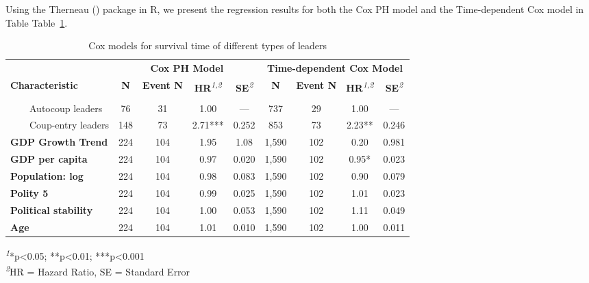 \documentclass[
  12pt,
]{report}
\begin{document}
Using the Therneau () package in R, we
present the regression results for both the Cox PH model and the
Time-dependent Cox model in Table Table~\ref{tbl-cox}.

\begingroup
\fontsize{12.0pt}{14.4pt}\selectfont
\setlength{\LTpost}{0mm}

\begin{longtable}{lcccccccc}

\caption{\label{tbl-cox}Cox models for survival time of different types
of leaders}

\tabularnewline

\toprule
 & \multicolumn{4}{c}{\textbf{Cox PH Model}} & \multicolumn{4}{c}{\textbf{Time-dependent Cox Model}} \\ 
\cmidrule(lr){2-5} \cmidrule(lr){6-9}
\textbf{Characteristic} & \textbf{N} & \textbf{Event N} & \textbf{HR}\textsuperscript{\textit{1,2}} & \textbf{SE}\textsuperscript{\textit{2}} & \textbf{N} & \textbf{Event N} & \textbf{HR}\textsuperscript{\textit{1,2}} & \textbf{SE}\textsuperscript{\textit{2}} \\ 
\midrule\addlinespace[2.5pt]
{\bfseries Leader Type} &  &  &  &  &  &  &  &  \\ 
    Autocoup leaders & 76 & 31 & 1.00 & — & 737 & 29 & 1.00 & — \\ 
    Coup-entry leaders & 148 & 73 & 2.71*** & 0.252 & 853 & 73 & 2.23** & 0.246 \\ 
{\bfseries GDP Growth Trend} & 224 & 104 & 1.95 & 1.08 & 1,590 & 102 & 0.20 & 0.981 \\ 
{\bfseries GDP per capita} & 224 & 104 & 0.97 & 0.020 & 1,590 & 102 & 0.95* & 0.023 \\ 
{\bfseries Population: log} & 224 & 104 & 0.98 & 0.083 & 1,590 & 102 & 0.90 & 0.079 \\ 
{\bfseries Polity 5} & 224 & 104 & 0.99 & 0.025 & 1,590 & 102 & 1.01 & 0.023 \\ 
{\bfseries Political stability} & 224 & 104 & 1.00 & 0.053 & 1,590 & 102 & 1.11 & 0.049 \\ 
{\bfseries Age} & 224 & 104 & 1.01 & 0.010 & 1,590 & 102 & 1.00 & 0.011 \\ 
\bottomrule

\end{longtable}

\begin{minipage}{\linewidth}
\textsuperscript{\textit{1}}*p\textless{}0.05; **p\textless{}0.01; ***p\textless{}0.001\\
\textsuperscript{\textit{2}}HR = Hazard Ratio, SE = Standard Error\\
\end{minipage}
\endgroup
\end{document}
